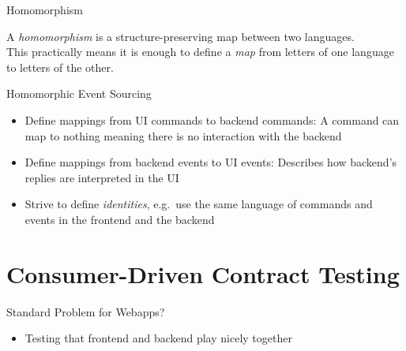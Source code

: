 \begin{frame}[fragile]{Homomorphism}

  A \emph{homomorphism} is a structure-preserving map between two languages. 
   \\[2em]
  
  This practically means it is enough to
  define a \emph{map} from letters of one language to letters of the other.

\end{frame}

\begin{frame}[fragile]{Homomorphic Event Sourcing}
  \begin{itemize}[<+->]
  \item Define mappings from UI commands to backend commands: A command
    can map to nothing meaning there is no interaction with
    the backend
  \item Define mappings from backend events to UI events: Describes how
    backend's replies are interpreted in the UI
  \item Strive to define \emph{identities}, e.g.~use the same language of commands and events in the frontend and the backend
  \end{itemize}
\end{frame}

\part{Consumer-Driven Contract Testing}

\begin{frame}[fragile]{Standard Problem for Webapps?}

\begin{itemize}
\item Testing that frontend and backend play nicely together
\end{itemize}

\end{frame}

